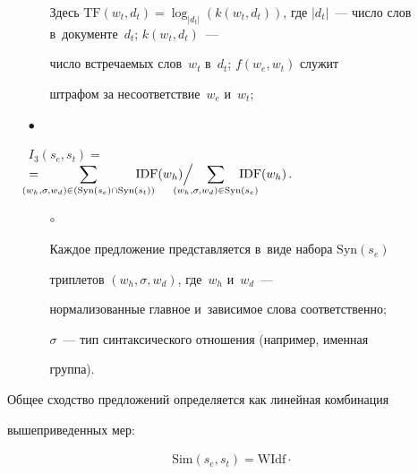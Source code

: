 \begin{multicols}{2}
\begin{itemize}
\begin{itemize}
Здесь $\mathrm{TF}(w_t,d_t)=\log_{\vert d_t\vert}\left( k(w_t,d_t)\right)$, где $\vert 


d_t\vert$~--- число слов в~документе~$d_t$; $k(w_t,d_t)$~---  


число встречаемых слов~$w_t$ в~$d_t$; $f(w_e, w_t)$ служит 


штрафом за несоответствие~$w_e$ и~$w_t$;


\end{itemize}


\item[$\bullet$]


$I_3\left(s_e, s_t\right)=$\\


$= \displaystyle


\hspace*{-16pt}{\sum\limits_{(w_h,\sigma,w_d)\in 


(\mathrm{Syn}(s_e)\cap \mathrm{Syn}(s_t))} \hspace*{-17pt}\mathrm{IDF}(w_h)}\Big /


\displaystyle\hspace*{-16pt}{\sum\limits_{(w_h,\sigma,w_d)\in 


\mathrm{Syn}(s_e)} \hspace*{-17pt}\mathrm{IDF}(w_h)}\,.$


  \begin{itemize}


  \item[$\circ$]


Каждое предложение представляется в~виде набора $\mathrm{Syn}(s_e)$ 


триплетов $(w_h,\sigma, w_d)$, где~$w_h$ и~$w_d$~--- 


нормализованные главное и~зависимое слова соответственно; 


$\sigma$~--- тип синтаксического отношения (например, именная 


группа).


  \end{itemize}


  \end{itemize}


  


  Общее сходство предложений определяется как линейная комбинация 


вышеприведенных мер: 


  \begin{multline*}


  \mathrm{Sim}\left(s_e, s_t\right) =\mathrm{WIdf}\cdot



\end{multline*}
\end{multicols}
